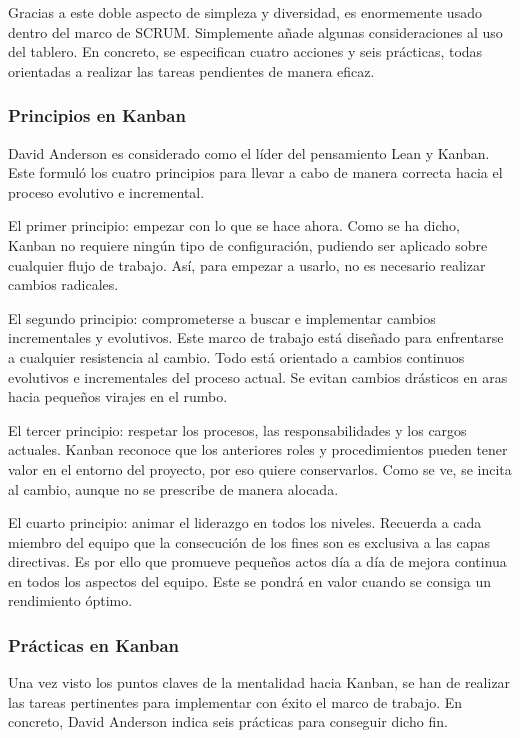Gracias a este doble aspecto de simpleza y diversidad, es enormemente usado dentro del marco de SCRUM. Simplemente añade algunas consideraciones al uso del tablero. En concreto, se especifican cuatro acciones y seis prácticas, todas orientadas a realizar las tareas pendientes de manera eficaz.

\subsubsection{Principios en Kanban}
David Anderson es considerado como el líder del pensamiento Lean y Kanban. Este formuló los cuatro principios para llevar a cabo de manera correcta hacia el proceso evolutivo e incremental.

El primer principio: empezar con lo que se hace ahora. Como se ha dicho, Kanban no requiere ningún tipo de configuración, pudiendo ser aplicado sobre cualquier flujo de trabajo. Así, para empezar a usarlo, no es necesario realizar cambios radicales.

El segundo principio: comprometerse a buscar e implementar cambios incrementales y evolutivos. Este marco de trabajo está diseñado para enfrentarse a cualquier resistencia al cambio. Todo está orientado a cambios continuos evolutivos e incrementales del proceso actual. Se evitan cambios drásticos en aras hacia pequeños virajes en el rumbo.

El tercer principio: respetar los procesos, las responsabilidades y los cargos actuales. Kanban reconoce que los anteriores roles y procedimientos pueden tener valor en el entorno del proyecto, por eso quiere conservarlos. Como se ve, se incita al cambio, aunque no se prescribe de manera alocada.

El cuarto principio: animar el liderazgo en todos los niveles. Recuerda a cada miembro del equipo que la consecución de los fines son es exclusiva a las capas directivas. Es por ello que promueve pequeños actos día a día de mejora continua en todos los aspectos del equipo. Este se pondrá en valor cuando se consiga un rendimiento óptimo.


\subsubsection{Prácticas en Kanban}
Una vez visto los puntos claves de la mentalidad hacia Kanban, se han de realizar las tareas pertinentes para implementar con éxito el marco de trabajo. En concreto, David Anderson indica seis prácticas para conseguir dicho fin.

